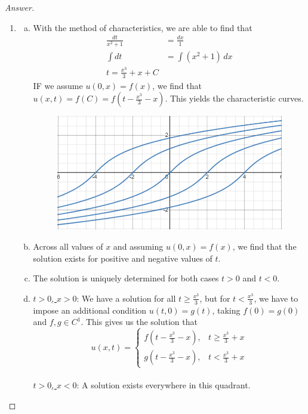 \documentclass{article}
\theoremstyle{definition}
\renewcommand\qedsymbol{$\blacksquare$}
\newenvironment{ans}{\begin{proof}[Answer]\renewcommand{\qedsymbol}{}}{\end{proof}}
\begin{document}
\begin{ans}
\begin{enumerate}[(1), series=answers]
                \item \begin{enumerate}[a)]
                    \item With the method of characteristics, we are able to find that
                    \begin{align*}
                        \frac{dt}{x^2+1} &= \frac{dx}{1}\\
                        \int dt &= \int (x^2+1)\,dx\\
                        t = \frac{x^3}{3} + x + C
                    \end{align*}
                    IF we assume $u(0, x) = f(x)$, we find that $\boxed{u(x,t) = f(C) = f\left(t - \frac{x^3}{3} - x\right)}$. This yields the characteristic curves.
                    \begin{figure}[H]
                        \centering
                        \includegraphics[height=2.3 in]{12 graph.png}
                    \end{figure}
                    
                    \item Across all values of $x$ and assuming $u(0,x)=f(x)$, we find that the solution exists for positive and negative values of $t$.

                    \item The solution is uniquely determined for both cases $t > 0$ and $t < 0$.

                    \item \underline{$t > 0$, $x > 0$}: We have a solution for all $t\geq \frac{x^3}{3}$, but for $t < \frac{x^3}{3}$, we have to impose an additional condition $u(t,0) = g(t)$, taking $f(0)=g(0)$ and $f,g\in C^1$. This gives us the solution that \begin{equation*}
                    u(x,t) =
                    \begin{cases}
                        f\left(t - \frac{x^3}{3} - x\right), & t \geq \frac{x^3}{3} + x\\
                        g\left(t - \frac{x^3}{3} - x\right), & t < \frac{x^3}{3} + x
                    \end{cases}
                    \end{equation*}\\
                    \underline{$t > 0$, $x < 0$}: A solution exists everywhere in this quadrant.
                    


\end{enumerate}
\end{enumerate}
\end{ans}
\end{document}
